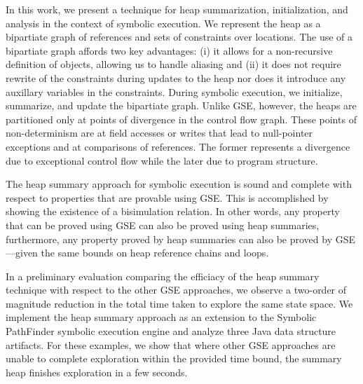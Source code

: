 In this work, we present a technique for heap summarization,
initialization, and analysis in the context of symbolic execution. We
represent the heap as a bipartiate graph of references and sets of
constraints over locations. The use of a bipartiate graph affords two
key advantages: (i) it allows for a non-recursive definition of
objects, allowing us to handle aliasing and (ii) it does not require
rewrite of the constraints during updates to the heap nor does it
introduce any auxillary variables in the constraints. During symbolic
execution, we initialize, summarize, and update the bipartiate
graph. Unlike GSE, however, the heaps are partitioned only at points
of divergence in the control flow graph. These points of
non-determinism are at field accesses or writes that lead to
null-pointer exceptions and at comparisons of references. The former
represents a divergence due to exceptional control flow while the
later due to program structure.


The heap summary approach for symbolic execution is sound and complete
with respect to properties that are provable using GSE. This is
accomplished by showing the existence of a bisimulation relation. In
other words, any property that can be proved using GSE can also be
proved using heap summaries, furthermore, any property proved by heap
summaries can also be proved by GSE---given the same bounds on heap
reference chains and loops.

In a preliminary evaluation comparing the efficiacy of the heap
summary technique with respect to the other GSE approaches, we observe
a two-order of magnitude reduction in the total time taken to explore
the same state space. We implement the heap summary approach as an
extension to the Symbolic PathFinder symbolic execution engine and
analyze three Java data structure artifacts. For these examples, we
show that where other GSE approaches are unable to complete
exploration within the provided time bound, the summary heap finishes
exploration in a few seconds.

